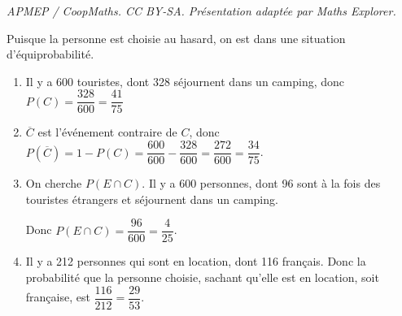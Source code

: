 \documentclass[10pt]{article}
\begin{document}
\noindent\textit{APMEP / CoopMaths. CC BY-SA. Présentation adaptée par Maths Explorer.}\par\medskip
Puisque la personne est choisie au hasard, on est dans une situation d'équiprobabilité.
\begin{enumerate}
  \item 
  
  Il y a 600 touristes, dont 328 séjournent dans un camping, donc \mbox{$P(C)=\dfrac{328}{600}=\dfrac{41}{75}$}
  \item 
  
  $\overline{C}$ est l’événement contraire de $C$, donc \mbox{$P(\overline{C})=1-P(C)=\dfrac{600}{600}-\dfrac{328}{600}=\dfrac{272}{600}=\dfrac{34}{75}$}.
  \item 
  
  On cherche \mbox{$P(E\cap C)$}. Il y a 600 personnes, dont 96 sont à la fois des touristes étrangers et séjournent dans un camping.
  
  Donc \mbox{$P(E\cap C)=\dfrac{96}{600}=\dfrac{4}{25}$}.
  \item

   Il y a 212 personnes qui sont en location, dont 116 français. Donc la probabilité que la personne choisie, sachant qu'elle est en location, soit française, est \mbox{$\dfrac{116}{212}=\dfrac{29}{53}$}.
\end{enumerate}


\end{document}
